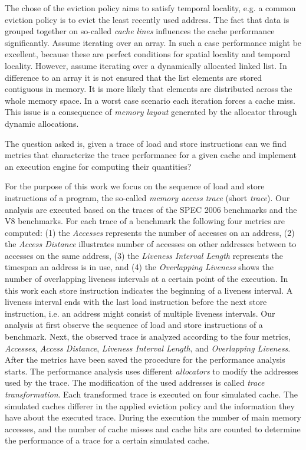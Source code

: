\documentclass[onecolumn, openright, master, english, signatures]{dbrgrptt}
\begin{document}
The chose of the eviction policy aims to satisfy temporal locality, e.g. a common eviction policy is to evict the least recently used address.
%
The fact that data is grouped together on so-called \emph{cache lines} influences the cache performance significantly.
Assume iterating over an array.
In such a case performance might be excellent, because these are perfect conditions for spatial locality and temporal locality.
However, assume iterating over a dynamically allocated linked list.
In difference to an array it is not ensured that the list elements are stored contiguous in memory.
It is more likely that elements are distributed across the whole memory space.
In a worst case scenario each iteration forces a cache miss.
This issue is a consequence of \emph{memory layout} generated by the allocator through dynamic allocations.

The question asked is, given a trace of load and store instructions can we find metrics that characterize the trace performance for a given cache and implement an execution engine for computing their quantities?

For the purpose of this work we focus on the sequence of load and store instructions of a program, the so-called \emph{memory access trace} (short \emph{trace}).
Our analysis are executed based on the traces of the SPEC 2006 benchmarks and the V8 benchmarks.
For each trace of a benchmark the following four metrics are computed:
(1) the \emph{Accesses} represents the number of accesses on an address,
(2) the \emph{Access Distance} illustrates number of accesses on other addresses between to accesses on the same address,
(3) the \emph{Liveness Interval Length} represents the timespan an address is in use, and
(4) the \emph{Overlapping Liveness} shows the number of overlapping liveness intervals at a certain point of the execution.
In this work each store instruction indicates the beginning of a liveness interval.
A liveness interval ends with the last load instruction before the next store instruction, i.e. an address might consist of multiple liveness intervals.
%
Our analysis at first observe the sequence of load and store instructions of a benchmark.
Next, the observed trace is analyzed according to the four metrics, \emph{Accesses}, \emph{Access Distance}, \emph{Liveness Interval Length}, and \emph{Overlapping Liveness}.
After the metrics have been saved the procedure for the performance analysis starts.
The performance analysis uses different \emph{allocators} to modify the addresses used by the trace.
The modification of the used addresses is called \emph{trace transformation}.
Each transformed trace is executed on four simulated cache.
The simulated caches differer in the applied eviction policy and the information they have about the executed trace.
During the execution the number of main memory accesses, and the number of cache misses and cache hits are counted to determine the performance of a trace for a certain simulated cache.
\end{document}
